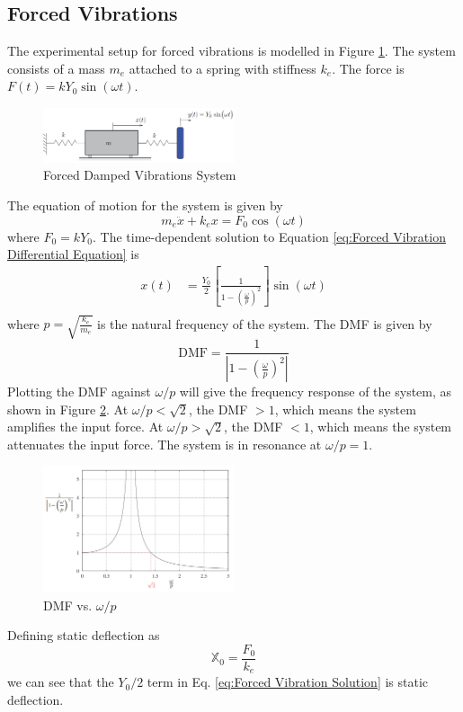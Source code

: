 \subsection{Forced Vibrations}
The experimental setup for forced vibrations is modelled in Figure \ref{fig:Forced Vibrations System Theoretical}. The system consists of a mass $m_e$ attached to a spring with stiffness $k_e$. The force is $F(t) = kY_0\sin(\omega t)$.
\begin{figure}[H]
    \centering
    \includegraphics[width=0.5\textwidth]{Sections/Figures/theory forced spring mass.png}
    \caption{Forced Damped Vibrations System}
    \label{fig:Forced Vibrations System Theoretical}
\end{figure}
The equation of motion for the system is given by
\begin{equation}
    m_e\ddot{x} + k_ex = F_0\cos(\omega t) \label{eq:Forced Vibration Differential Equation}
\end{equation}
where $F_0 = kY_0$. The time-dependent solution to Equation \ref{eq:Forced Vibration Differential Equation} is 
\begin{align}
    x(t) &= \frac{Y_0}{2} \left[\frac{1}{1 - \left(\frac{\omega}{p}\right)^2}\right]\sin(\omega t) \label{eq:Forced Vibration Solution} \\
\end{align}
where $p = \sqrt{\frac{k_e}{m_e}}$ is the natural frequency of the system. The DMF is given by
\begin{equation}
    \text{DMF} = \frac{1}{\left|1 - \left(\frac{\omega}{p}\right)^2\right|} \label{eq:DMF}
\end{equation}
Plotting the DMF against $\omega/p$ will give the frequency response of the system, as shown in Figure \ref{fig:DMF}. At $\omega/p< \sqrt{2}$, the DMF $>1$, which means the system amplifies the input force. At $\omega/p > \sqrt{2}$, the DMF $<1$, which means the system attenuates the input force. The system is in resonance at $\omega/p = 1$.
\begin{figure}[h]
    \centering
    \includegraphics[width=0.5\textwidth]{Sections/Figures/DMF.png}
    \caption{DMF vs. $\omega/p$}
    \label{fig:DMF}
\end{figure}
Defining static deflection as 
\begin{equation}
    \mathbb{X}_0 = \frac{F_0}{k_e} \label{eq:Static Deflection}
\end{equation}
we can see that the $Y_0/2$ term in Eq. \ref{eq:Forced Vibration Solution} is static deflection.

